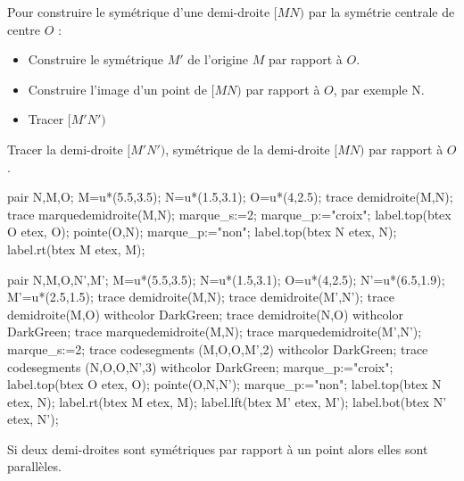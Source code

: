 \begin{methode}
    Pour construire le symétrique d'une demi-droite $[MN)$ par la symétrie centrale de centre $O$ :
    \begin{itemize}
        \item Construire le symétrique $M'$ de l'origine $M$ par rapport à $O$.
        \item Construire l'image d'un point de $[MN)$ par rapport à $O$, par exemple N.
        \item Tracer $[M'N')$
    \end{itemize}
    \exercice
    Tracer la demi-droite $[M'N')$, symétrique de la demi-droite $[MN)$ par rapport à $O$.
    
    \bigskip
    \begin{Geometrie}[CoinHD={(8u,4u)}]
        pair N,M,O;
        M=u*(5.5,3.5);
        N=u*(1.5,3.1);
        O=u*(4,2.5);
        trace demidroite(M,N);
        trace marquedemidroite(M,N);
        marque_s:=2;
        marque_p:="croix";
        label.top(btex O etex, O);
        pointe(O,N);
        marque_p:="non";
        label.top(btex N etex, N);        
        label.rt(btex M etex, M);
    \end{Geometrie}
    \correction
    \begin{Geometrie}[CoinHD={(8u,4u)}]
        pair N,M,O,N',M';
        M=u*(5.5,3.5);
        N=u*(1.5,3.1);
        O=u*(4,2.5);
        N'=u*(6.5,1.9);
        M'=u*(2.5,1.5);
        trace demidroite(M,N);
        trace demidroite(M',N');
        trace demidroite(M,O) withcolor DarkGreen;
        trace demidroite(N,O) withcolor DarkGreen;
        trace marquedemidroite(M,N);
        trace marquedemidroite(M',N');
        marque_s:=2;
        trace codesegments (M,O,O,M',2) withcolor DarkGreen;
        trace codesegments (N,O,O,N',3) withcolor DarkGreen;
        marque_p:="croix";
        label.top(btex O etex, O);
        pointe(O,N,N');
        marque_p:="non";
        label.top(btex N etex, N);
        label.rt(btex M etex, M);
        label.lft(btex M' etex, M');
        label.bot(btex N' etex, N');
    \end{Geometrie}
\end{methode}

\begin{propriete}[\admise]
    Si deux demi-droites sont symétriques par rapport à un point alors elles sont parallèles.
\end{propriete}

